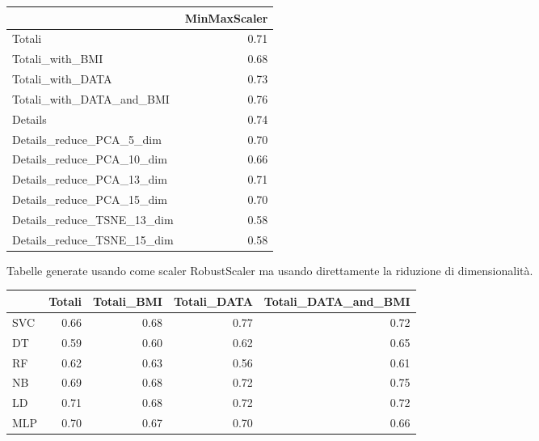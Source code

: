 \documentclass[12pt,italian]{report}
\begin{document}
\begin{table}[h]
	\begin{center}
		\begin{adjustbox}{max width=\textwidth, max totalheight={5.5cm}}
			\begin{tabular}{lr}
				\toprule
				{} &  MinMaxScaler \\
				\midrule
				Totali                     &      0.71 \\
				Totali\_with\_BMI            &      0.68 \\
				Totali\_with\_DATA           &      0.73 \\
				Totali\_with\_DATA\_and\_BMI   &      0.76 \\
				Details                    &      0.74 \\
				Details\_reduce\_PCA\_5\_dim   &      0.70 \\
				Details\_reduce\_PCA\_10\_dim  &      0.66 \\
				Details\_reduce\_PCA\_13\_dim  &      0.71 \\
				Details\_reduce\_PCA\_15\_dim  &      0.70 \\
				Details\_reduce\_TSNE\_13\_dim &      0.58 \\
				Details\_reduce\_TSNE\_15\_dim &      0.58 \\
				\bottomrule
			\end{tabular}
		\end{adjustbox}
	\end{center}
\end{table}

\newpage

Tabelle generate usando come scaler RobustScaler ma usando direttamente la riduzione di dimensionalità.
\begin{table}[h]
	\begin{center}
		\begin{adjustbox}{max width=\textwidth, max totalheight= {3.3cm}}
			\begin{tabular}{lrrrr}
				\toprule
				{} &    Totali &  Totali\_BMI &  Totali\_DATA &  Totali\_DATA\_and\_BMI \\
				\midrule
				SVC &  0.66 &         0.68 &          0.77 &                  0.72 \\
				DT  &  0.59 &         0.60 &          0.62 &                  0.65 \\
				RF  &  0.62 &         0.63 &          0.56 &                  0.61 \\
				NB  &  0.69 &         0.68 &          0.72 &                  0.75 \\
				LD  &  0.71 &         0.68 &          0.72 &                  0.72 \\
				MLP &  0.70 &         0.67 &          0.70 &                  0.66 \\
				\bottomrule
			\end{tabular}
		\end{adjustbox}
	\end{center}
\end{table}
\end{document}
